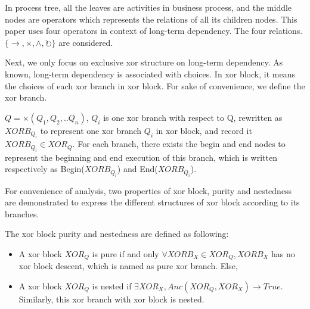 In process tree, all the leaves are activities in business process, and the middle nodes are operators which represents the relations of all its children nodes\cite{vanderAalst:2016:PMD:2948762,leemans2013discovering}. This paper uses four operators in context of long-term dependency. The four relations.  $\{\rightarrow, \times, \land, \circlearrowright\}$ are considered. 

Next, we only focus on exclusive xor structure on long-term dependency. As known, long-term dependency is associated with choices. In xor block, it means the choices of each xor branch in xor block. For sake of convenience, we define the xor branch.

$Q= \times(Q_1 , Q_2 ,.. Q_n)$, $Q_i$ is one xor branch with respect to Q, rewritten as $XORB_{Q_i}$ to represent one xor branch $Q_i$ in xor block, and record it $XORB_{Q_i} \in XOR_{Q}$. For each branch, there exists the begin and end nodes to represent the beginning and end execution of this branch, which is written respectively as Begin($XORB_{Q_i}$) and End($XORB_{Q_i}$).

For convenience of analysis, two properties of xor block, purity and nestedness are demonstrated to express the different structures of xor block according to its branches.
\begin{definition} The xor block purity and nestedness are defined as following: \\
	\begin{itemize}
		\item A xor block $XOR_Q$ is pure if and only $\forall XORB_X \in XOR_Q, XORB_X $ has no xor block descent, which is named as pure xor branch. Else,
		\item A xor block $XOR_Q$ is nested if $ \exists XOR_X, Anc(XOR_Q, XOR_X) \rightarrow True  $. Similarly, this xor branch with xor block is nested.
	\end{itemize}
\end{definition}


